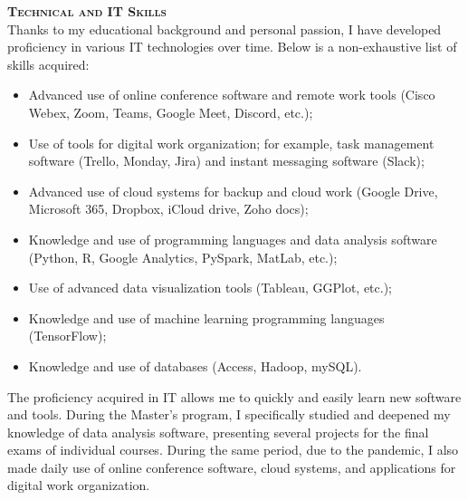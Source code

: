 \newpage

\textbf{\textsc{Technical and IT Skills}} \\
Thanks to my educational background and personal passion, I have developed proficiency in various IT technologies over time. Below is a non-exhaustive list of skills acquired:
\begin{itemize}
    \item Advanced use of online conference software and remote work tools (Cisco Webex, Zoom, Teams, Google Meet, Discord, etc.);
    \item Use of tools for digital work organization; for example, task management software (Trello, Monday, Jira) and instant messaging software (Slack);
    \item Advanced use of cloud systems for backup and cloud work (Google Drive, Microsoft 365, Dropbox, iCloud drive, Zoho docs);
    \item Knowledge and use of programming languages and data analysis software (Python, R, Google Analytics, PySpark, MatLab, etc.);
    \item Use of advanced data visualization tools (Tableau, GGPlot, etc.);
    \item Knowledge and use of machine learning programming languages (TensorFlow);
    \item Knowledge and use of databases (Access, Hadoop, mySQL).
\end{itemize}
The proficiency acquired in IT allows me to quickly and easily learn new software and tools.
During the Master’s program, I specifically studied and deepened my knowledge of data analysis software, presenting several projects for the final exams of individual courses.
During the same period, due to the pandemic, I also made daily use of online conference software, cloud systems, and applications for digital work organization.

